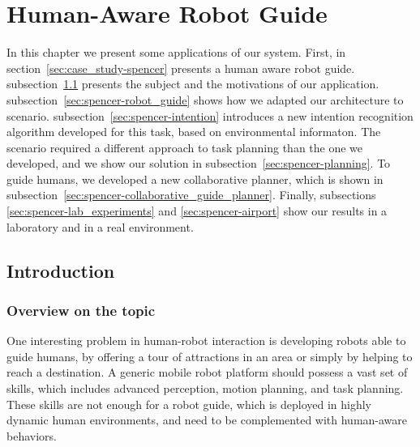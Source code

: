 
\chapter{Human-Aware Robot Guide} %

\label{chapter:case_study} %


In this chapter we present some applications of our system. First, in section~\ref{sec:case_study-spencer} presents a human aware robot guide. subsection~\ref{sec:spencer-intro} presents the subject and the motivations of our application. subsection~\ref{sec:spencer-robot_guide} shows how we adapted our architecture to scenario. subsection~\ref{sec:spencer-intention} introduces a new intention recognition algorithm developed for this task, based on environmental informaton. The scenario required a different approach to task planning than the one we developed, and we show our solution in subsection~\ref{sec:spencer-planning}. To guide humans, we developed a new collaborative planner, which is shown in subsection~\ref{sec:spencer-collaborative_guide_planner}. Finally, subsections \ref{sec:spencer-lab_experiments} and \ref{sec:spencer-airport} show our results in a laboratory and in a real environment.

\section{Introduction}
\label{sec:spencer-intro}
\subsection{Overview on the topic}
One interesting problem in human-robot interaction is developing robots able to guide humans, by offering a tour of attractions in an area or simply by helping to reach a destination.
A generic mobile robot platform should possess a vast set of skills, which includes advanced perception, motion planning, and task planning. These skills are not enough for a robot guide, which is deployed in highly dynamic human environments, and need to be complemented with human-aware behaviors.

